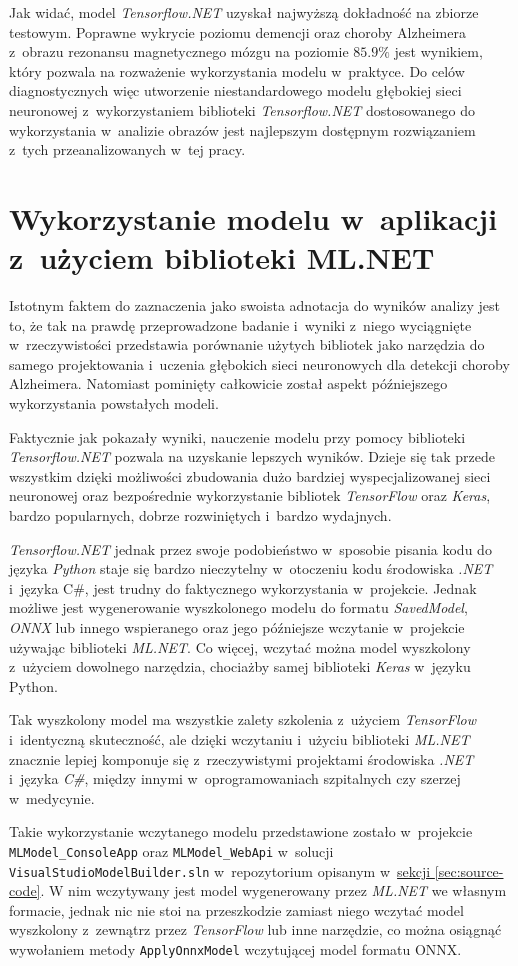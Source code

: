 Jak widać, model \emph{Tensorflow.NET} uzyskał najwyższą dokładność na zbiorze testowym.
Poprawne wykrycie poziomu demencji oraz choroby Alzheimera z~obrazu rezonansu magnetycznego mózgu na poziomie $85.9\%$ jest wynikiem, który pozwala na rozważenie wykorzystania modelu w~praktyce.
Do celów diagnostycznych więc utworzenie niestandardowego modelu głębokiej sieci neuronowej z~wykorzystaniem biblioteki \emph{Tensorflow.NET} dostosowanego do wykorzystania w~analizie obrazów jest najlepszym dostępnym rozwiązaniem z~tych przeanalizowanych w~tej pracy.

\section{Wykorzystanie modelu w~aplikacji z~użyciem biblioteki ML.NET}

Istotnym faktem do zaznaczenia jako swoista adnotacja do wyników analizy jest to, że tak na prawdę przeprowadzone badanie i~wyniki z~niego wyciągnięte w~rzeczywistości przedstawia porównanie użytych bibliotek jako narzędzia do samego projektowania i~uczenia głębokich sieci neuronowych dla detekcji choroby Alzheimera.
Natomiast pominięty całkowicie został aspekt późniejszego wykorzystania powstałych modeli.

Faktycznie jak pokazały wyniki, nauczenie modelu przy pomocy biblioteki \emph{Tensorflow.NET} pozwala na uzyskanie lepszych wyników.
Dzieje się tak przede wszystkim dzięki możliwości zbudowania dużo bardziej wyspecjalizowanej sieci neuronowej oraz bezpośrednie wykorzystanie bibliotek \emph{TensorFlow} oraz \emph{Keras}, bardzo popularnych, dobrze rozwiniętych i~bardzo wydajnych.

\emph{Tensorflow.NET} jednak przez swoje podobieństwo w~sposobie pisania kodu do języka \emph{Python} staje się bardzo nieczytelny w~otoczeniu kodu środowiska \emph{.NET} i~języka C\#, jest trudny do faktycznego wykorzystania w~projekcie.
Jednak możliwe jest wygenerowanie wyszkolonego modelu do formatu \emph{SavedModel}, \emph{ONNX} lub innego wspieranego oraz jego późniejsze wczytanie w~projekcie używając biblioteki \emph{ML.NET}.
Co więcej, wczytać można model wyszkolony z~użyciem dowolnego narzędzia, chociażby samej biblioteki \emph{Keras} w~języku Python.

Tak wyszkolony model ma wszystkie zalety szkolenia z~użyciem \emph{TensorFlow} i~identyczną skuteczność, ale dzięki wczytaniu i~użyciu biblioteki \emph{ML.NET} znacznie lepiej komponuje się z~rzeczywistymi projektami środowiska \emph{.NET} i~języka \emph{C\#}, między innymi w~oprogramowaniach szpitalnych czy szerzej w~medycynie.

Takie wykorzystanie wczytanego modelu przedstawione zostało w~projekcie \lstinline{MLModel_ConsoleApp} oraz \lstinline{MLModel_WebApi} w~solucji \lstinline{VisualStudioModelBuilder.sln} w~repozytorium opisanym w~\hyperref[sec:source-code]{sekcji \ref*{sec:source-code}}.
W nim wczytywany jest model wygenerowany przez \emph{ML.NET} we własnym formacie, jednak nic nie stoi na przeszkodzie zamiast niego wczytać model wyszkolony z~zewnątrz przez \emph{TensorFlow} lub inne narzędzie, co można osiągnąć wywołaniem metody \lstinline{ApplyOnnxModel} wczytującej model formatu ONNX.
